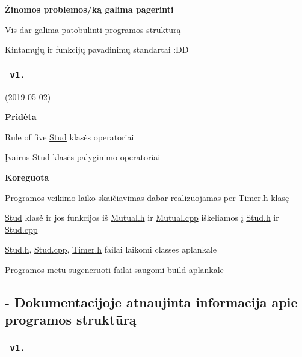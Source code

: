 {\bfseries{Žinomos problemos/ką galima pagerinti}}
\begin{DoxyItemize}
\item Vis dar galima patobulinti programos struktūrą
\item Kintamųjų ir funkcijų pavadinimų standartai \+:DD
\end{DoxyItemize}



 \subsubsection*{\href{https://github.com/gitguuddd/Obj_Duomenu_Apdorojimas_class/releases/tag/v1.2}{\texttt{ v1.}}}

(2019-\/05-\/02)



{\bfseries{Pridėta}}
\begin{DoxyItemize}
\item {\ttfamily Rule of five} {\ttfamily \mbox{\hyperlink{class_stud}{Stud}}} klasės operatoriai
\item Įvairūs {\ttfamily \mbox{\hyperlink{class_stud}{Stud}}} klasės palyginimo operatoriai
\end{DoxyItemize}

{\bfseries{Koreguota}}
\begin{DoxyItemize}
\item Programos veikimo laiko skaičiavimas dabar realizuojamas per {\ttfamily \mbox{\hyperlink{_timer_8h}{Timer.\+h}}} klasę
\item \mbox{\hyperlink{class_stud}{Stud}} klasė ir jos funkcijos iš {\ttfamily \mbox{\hyperlink{_mutual_8h}{Mutual.\+h}}} ir {\ttfamily \mbox{\hyperlink{_mutual_8cpp}{Mutual.\+cpp}}} iškeliamos į {\ttfamily \mbox{\hyperlink{_stud_8h}{Stud.\+h}}} ir {\ttfamily \mbox{\hyperlink{_stud_8cpp}{Stud.\+cpp}}}
\item {\ttfamily \mbox{\hyperlink{_stud_8h}{Stud.\+h}}, \mbox{\hyperlink{_stud_8cpp}{Stud.\+cpp}}, \mbox{\hyperlink{_timer_8h}{Timer.\+h}}} failai laikomi classes aplankale
\item Programos metu sugeneruoti failai saugomi {\ttfamily build} aplankale \subsection*{-\/ Dokumentacijoje atnaujinta informacija apie programos struktūrą }
\end{DoxyItemize}

\subsubsection*{\href{https://github.com/gitguuddd/Obj_Duomenu_Apdorojimas_class/releases/tag/v1.1}{\texttt{ v1.}}}

